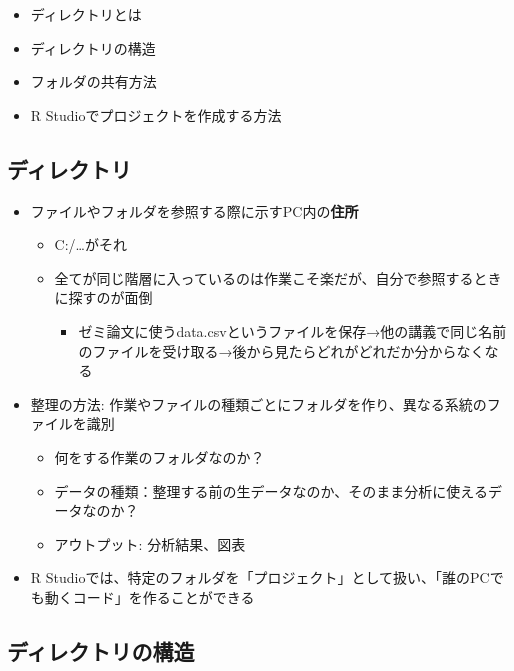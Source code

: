 \documentclass[
]{ltjsarticle}
\providecommand{\tightlist}{%
  \setlength{\itemsep}{0pt}\setlength{\parskip}{0pt}}
\begin{document}
\begin{itemize}
\tightlist
\item
  ディレクトリとは
\item
  ディレクトリの構造
\item
  フォルダの共有方法
\item
  R Studioでプロジェクトを作成する方法
\end{itemize}

\hypertarget{ux30c7ux30a3ux30ecux30afux30c8ux30ea}{%
\subsection{ディレクトリ}\label{ux30c7ux30a3ux30ecux30afux30c8ux30ea}}

\begin{itemize}
\tightlist
\item
  ファイルやフォルダを参照する際に示すPC内の\textbf{住所}

  \begin{itemize}
  \tightlist
  \item
    C:/\ldots がそれ
  \item
    全てが同じ階層に入っているのは作業こそ楽だが、自分で参照するときに探すのが面倒

    \begin{itemize}
    \tightlist
    \item
      ゼミ論文に使うdata.csvというファイルを保存→他の講義で同じ名前のファイルを受け取る→後から見たらどれがどれだか分からなくなる
    \end{itemize}
  \end{itemize}
\item
  整理の方法:
  作業やファイルの種類ごとにフォルダを作り、異なる系統のファイルを識別

  \begin{itemize}
  \tightlist
  \item
    何をする作業のフォルダなのか？
  \item
    データの種類：整理する前の生データなのか、そのまま分析に使えるデータなのか？
  \item
    アウトプット: 分析結果、図表
  \end{itemize}
\item
  R
  Studioでは、特定のフォルダを「プロジェクト」として扱い、「誰のPCでも動くコード」を作ることができる
\end{itemize}

\hypertarget{ux30c7ux30a3ux30ecux30afux30c8ux30eaux306eux69cbux9020}{%
\subsection{ディレクトリの構造}\label{ux30c7ux30a3ux30ecux30afux30c8ux30eaux306eux69cbux9020}}
\end{document}
